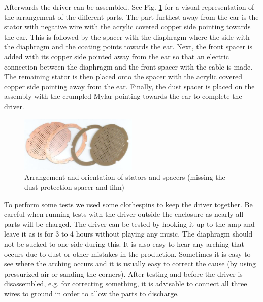 \documentclass{article}
\begin{document}
Afterwards the driver can be assembled. See Fig. \ref{f:driver:assembly:arrangement} for a visual representation of the arrangement of the different parts. The part furthest away from the ear is the stator with negative wire with the acrylic covered copper side pointing towards the ear. This is followed by the spacer with the diaphragm where the side with the diaphragm and the coating points towards the ear. Next, the front spacer is added with its copper side pointed away from the ear so that an electric connection between the diaphragm and the front spacer with the cable is made. The remaining stator is then placed onto the spacer with the acrylic covered copper side pointing away from the ear. Finally, the dust spacer is placed on the assembly with the crumpled Mylar pointing towards the ear to complete the driver.

\begin{figure}[htb]
    \centering
    \includegraphics[width=0.5\textwidth]{images/arrangement.png}
    \caption{Arrangement and orientation of stators and spacers (missing the dust protection spacer and film)}
    \label{f:driver:assembly:arrangement}
\end{figure}

To perform some tests we used some clothespins to keep the driver together. Be careful when running tests with the driver outside the enclosure as nearly all parts will be charged. The driver can be tested by hooking it up to the amp and leave it as is for 3 to 4 hours without playing any music. The diaphragm should not be sucked to one side during this. It is also easy to hear any arching that occurs due to dust or other mistakes in the production. Sometimes it is easy to see where the arching occurs and it is usually easy to correct the cause (by using pressurized air or sanding the corners). After testing and before the driver is disassembled, e.g. for correcting something, it is advisable to connect all three wires to ground in order to allow the parts to discharge.
\end{document}
